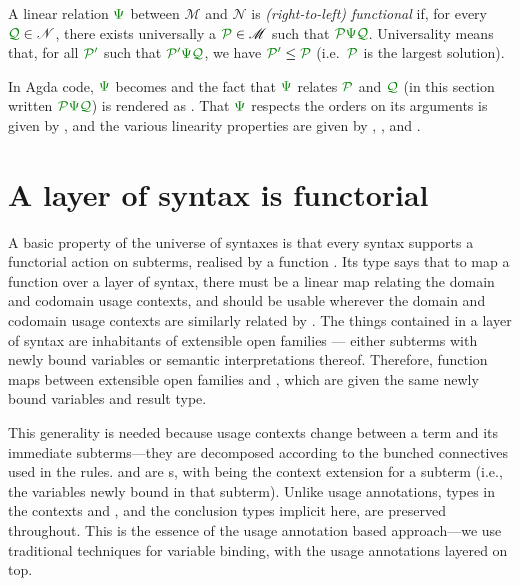 \begin{definition}\label{def:functional-linear-relation}
  A linear relation $\gr\Psi$ between $\mathscr M$ and $\mathscr N$ is
  \emph{(right-to-left) functional} if, for every $\grQ \in \mathscr N$, there
  exists universally a $\grP \in \mathscr M$ such that $\grP\gr\Psi\grQ$.
  Universality means that, for all $\grPprime$ such that $\grPprime\gr\Psi\grQ$,
  we have $\grPprime \leq \grP$ (i.e.\ $\grP$ is the largest solution).
\end{definition}

In Agda code, $\gr\Psi$ becomes \AgdaBound{$\Psi$} and the fact that $\gr\Psi$
relates $\grP$ and $\grQ$ (in this section written $\grP\gr\Psi\grQ$) is
rendered as
\AgdaSpace{}\AgdaSpace{}.
That $\gr\Psi$ respects the orders on its arguments is given by
, and the various linearity properties are given by
, , and .

\section{A layer of syntax is functorial}\label{sec:functorial}

A basic property of the universe of syntaxes
is that every syntax supports a functorial action on subterms, realised by a
function .
Its type says that to map a function 
over a layer of syntax, there must be a linear map \AgdaBound{$\Psi$} relating the
domain and codomain usage contexts, and  should be usable
wherever the domain and codomain usage contexts are similarly related by
\AgdaBound{$\Psi$}.
The things contained in a layer of syntax are inhabitants of extensible open
families --- either subterms with newly bound variables \AgdaBound{$\Theta$} or
semantic interpretations thereof.
Therefore, function  maps between extensible open families
 and , which are given the same newly bound variables
and result type.


This generality is needed because usage contexts change between
a term and its immediate subterms---they are decomposed according to the bunched connectives used in the rules.
 and  are s, with
\AgdaBound{$\Theta$} being the context extension for a subterm (i.e., the
variables newly bound in that subterm).
Unlike usage annotations, types in the contexts \AgdaBound{$\gamma$} and \AgdaBound{$\delta$}, and the conclusion types implicit here, are preserved throughout.
This is the essence of the usage annotation based approach---we use traditional techniques for variable binding, with the usage annotations layered on top.


